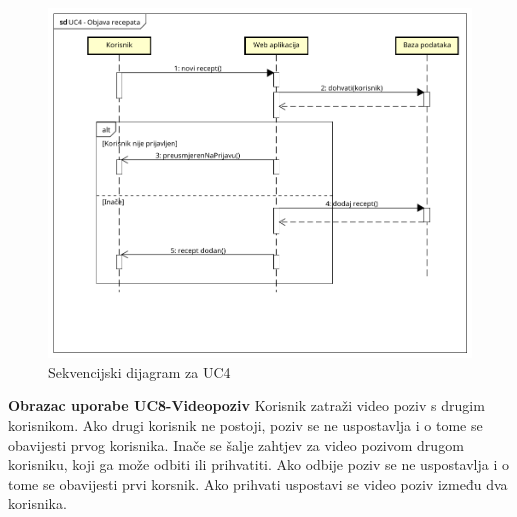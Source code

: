 				\begin{figure}[H]
					\includegraphics[scale= 0.6]{slike/sekvencijski_dijagramUC4.png}
					\centering
					\caption{Sekvencijski dijagram za UC4}
					\label{fig:Sekvencijski dijagram za UC4}
				\end{figure}

				\eject

				\noindent
				\textbf{Obrazac uporabe UC8-Videopoziv}\newline
					{Korisnik zatraži video poziv s drugim korisnikom. Ako drugi korisnik ne postoji, poziv se ne uspostavlja i o tome se obavijesti prvog korisnika. Inače se šalje zahtjev za video pozivom drugom korisniku, koji ga može odbiti ili prihvatiti. Ako odbije poziv se ne uspostavlja i o tome se obavijesti prvi korsnik. Ako prihvati uspostavi se video poziv između dva korisnika.}
				

